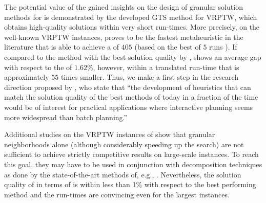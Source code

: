 \documentclass[11pt,a4paper,fleqn]{article}
\begin{document}
The potential value of the gained insights on the design of granular solution methods for \problemClassShortS is demonstrated by the developed GTS method for VRPTW, which obtains  high-quality solutions within very short run-times. More precisely, on the well-known \citet{solomon:87} VRPTW instances, \tsnew proves to be the fastest metaheuristic in the literature that is able to achieve a \cnv of $405$ (based on the best of $5$ runs ).  If compared to the method with the best solution quality by \citet{nagata:10}, \tsnew shows an average gap with respect to the \ctd of $1.62\%$, however, within a translated run-time that is approximately $55$ times smaller. Thus, we make a first step in the research direction proposed by \citet{DesMR14}, who state that ``the development of heuristics that can match the solution quality of the best methods of today in a fraction of the time would be of interest for practical applications where interactive planning seems more widespread than batch planning.''

Additional studies on the VRPTW instances of \citet{gehring:99} show that granular neighborhoods alone (although considerably speeding up the search) are not sufficient to achieve strictly competitive results on large-scale instances. To reach this goal, they may have to be used in conjunction with decomposition techniques as done by the state-of-the-art methods of, e.g., \citet{vidal:13}. Nevertheless, the solution quality of \tsnew in terms of \cnv is within less than 1\% with respect to the best performing method and the run-times are convincing even for the largest instances.
\end{document}
